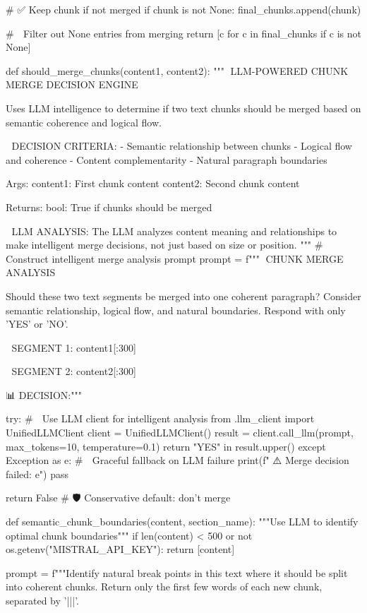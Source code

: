         # ✅ Keep chunk if not merged
        if chunk is not None:
            final_chunks.append(chunk)
    
    # 🧹 Filter out None entries from merging
    return [c for c in final_chunks if c is not None]

def should_merge_chunks(content1, content2):
    """🧠 LLM-POWERED CHUNK MERGE DECISION ENGINE
    
    Uses LLM intelligence to determine if two text chunks should be merged
    based on semantic coherence and logical flow.
    
    🎯 DECISION CRITERIA:
    - Semantic relationship between chunks
    - Logical flow and coherence
    - Content complementarity
    - Natural paragraph boundaries
    
    Args:
        content1: First chunk content
        content2: Second chunk content
        
    Returns:
        bool: True if chunks should be merged
        
    🧠 LLM ANALYSIS:
    The LLM analyzes content meaning and relationships to make
    intelligent merge decisions, not just based on size or position.
    """
    # 🧠 Construct intelligent merge analysis prompt
    prompt = f"""🎯 CHUNK MERGE ANALYSIS
    
Should these two text segments be merged into one coherent paragraph?
Consider semantic relationship, logical flow, and natural boundaries.
Respond with only 'YES' or 'NO'.

📄 SEGMENT 1: {content1[:300]}

📄 SEGMENT 2: {content2[:300]}

📊 DECISION:"""
    
    try:
        # 🚀 Use LLM client for intelligent analysis
        from .llm_client import UnifiedLLMClient
        client = UnifiedLLMClient()
        result = client.call_llm(prompt, max_tokens=10, temperature=0.1)
        return "YES" in result.upper()
    except Exception as e:
        # 🔄 Graceful fallback on LLM failure
        print(f"    ⚠️ Merge decision failed: {e}")
        pass
    
    return False  # 🛡️ Conservative default: don't merge

def semantic_chunk_boundaries(content, section_name):
    """Use LLM to identify optimal chunk boundaries"""
    if len(content) < 500 or not os.getenv("MISTRAL_API_KEY"):
        return [content]
    
    prompt = f"""Identify natural break points in this text where it should be split into coherent chunks.
Return only the first few words of each new chunk, separated by '|||'.

